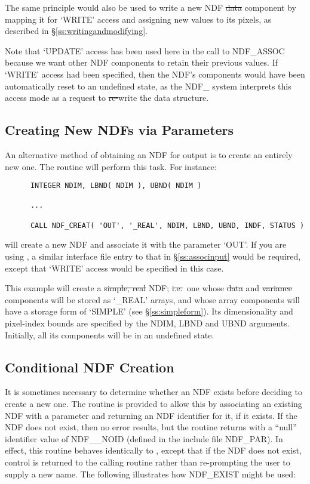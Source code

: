 The same principle would also be used to write a new NDF \st{data\/}
component by mapping it for `WRITE' access and assigning new values to its
pixels, as described in \S\ref{ss:writingandmodifying}. 

Note that `UPDATE' access has been used here in the call to NDF\_ASSOC
because we want other NDF components to retain their previous values. 
If `WRITE' access had been specified, then the NDF's components would have
been automatically reset to an undefined state, as the NDF\_ system
interprets this access mode as a request to \st{re-\/}write the data
structure. 

\subsection{\label{ss:creatingndfs}Creating New NDFs via Parameters}

An alternative method of obtaining an NDF for output is to create an
entirely new one. 
The  routine will perform this task.
For instance:

\small
\begin{verbatim}
      INTEGER NDIM, LBND( NDIM ), UBND( NDIM )

      ...

      CALL NDF_CREAT( 'OUT', '_REAL', NDIM, LBND, UBND, INDF, STATUS )
\end{verbatim}
\normalsize

will create a new NDF and associate it with the parameter `OUT'.  If
you are using , a similar interface file entry to that in
\S\ref{ss:associnput} would be required, except that `WRITE' access
would be specified in this case.

This example will create a \st{simple, real\/} NDF; \st{i.e.}\ one whose
\st{data\/} and \st{variance\/} components will be stored as `\_REAL'
arrays, and whose array components will have a storage form of `SIMPLE' (see
\S\ref{ss:simpleform}). 
Its dimensionality and pixel-index bounds are specified by the NDIM, LBND
and UBND arguments. 
Initially, all its components will be in an undefined state.

\subsection{\label{ss:exist}Conditional NDF Creation}

It is sometimes necessary to determine whether an NDF exists before deciding
to create a new one. 
The routine  is provided to allow this by associating an existing
NDF with a parameter and returning an NDF identifier for it, if it
exists. 
If the NDF does not exist, then no error results, but the routine returns
with a ``null'' identifier value of NDF\_\_NOID (defined in the include file
NDF\_PAR). 
In effect, this routine behaves identically to , except that if
the NDF does not exist, control is returned to the calling routine rather
than re-prompting the user to supply a new name. 
The following illustrates how NDF\_EXIST might be used:

